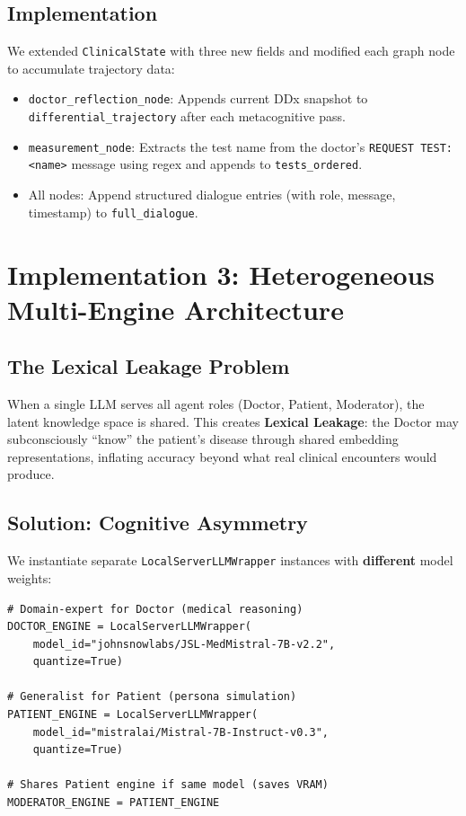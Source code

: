 \documentclass[12pt, a4paper]{article}
\begin{document}
\subsection{Implementation}

We extended \texttt{ClinicalState} with three new fields and modified each
graph node to accumulate trajectory data:

\begin{itemize}
    \item \texttt{doctor\_reflection\_node}: Appends current DDx snapshot to
    \texttt{differential\_trajectory} after each metacognitive pass.
    \item \texttt{measurement\_node}: Extracts the test name from the doctor's
    \texttt{REQUEST TEST: <name>} message using regex and appends to
    \texttt{tests\_ordered}.
    \item All nodes: Append structured dialogue entries (with role, message,
    timestamp) to \texttt{full\_dialogue}.
\end{itemize}

\section{Implementation 3: Heterogeneous Multi-Engine Architecture}
\label{sec:heterogeneous}

\subsection{The Lexical Leakage Problem}

When a single LLM serves all agent roles (Doctor, Patient, Moderator), the
latent knowledge space is shared. This creates \textbf{Lexical Leakage}: the
Doctor may subconsciously ``know'' the patient's disease through shared
embedding representations, inflating accuracy beyond what real clinical
encounters would produce.

\subsection{Solution: Cognitive Asymmetry}

We instantiate separate \texttt{LocalServerLLMWrapper} instances with
\textbf{different} model weights:

\begin{lstlisting}[caption={Heterogeneous engine initialization.}]
# Domain-expert for Doctor (medical reasoning)
DOCTOR_ENGINE = LocalServerLLMWrapper(
    model_id="johnsnowlabs/JSL-MedMistral-7B-v2.2",
    quantize=True)

# Generalist for Patient (persona simulation)
PATIENT_ENGINE = LocalServerLLMWrapper(
    model_id="mistralai/Mistral-7B-Instruct-v0.3",
    quantize=True)

# Shares Patient engine if same model (saves VRAM)
MODERATOR_ENGINE = PATIENT_ENGINE
\end{lstlisting}
\end{document}
